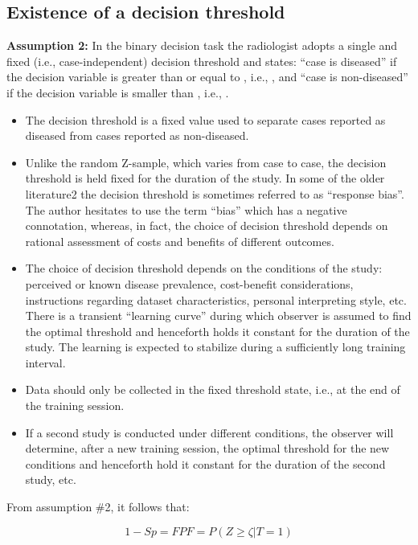 \documentclass[
]{book}
\providecommand{\tightlist}{%
  \setlength{\itemsep}{0pt}\setlength{\parskip}{0pt}}
\begin{document}
\hypertarget{existence-of-a-decision-threshold}{%
\subsection{Existence of a decision threshold}\label{existence-of-a-decision-threshold}}

\textbf{Assumption 2:} In the binary decision task the radiologist adopts a single and fixed (i.e., case-independent) decision threshold and states: ``case is diseased'' if the decision variable is greater than or equal to , i.e., , and ``case is non-diseased'' if the decision variable is smaller than , i.e., .

\begin{itemize}
\tightlist
\item
  The decision threshold is a fixed value used to separate cases reported as diseased from cases reported as non-diseased.
\item
  Unlike the random Z-sample, which varies from case to case, the decision threshold is held fixed for the duration of the study. In some of the older literature2 the decision threshold is sometimes referred to as ``response bias''. The author hesitates to use the term ``bias'' which has a negative connotation, whereas, in fact, the choice of decision threshold depends on rational assessment of costs and benefits of different outcomes.
\item
  The choice of decision threshold depends on the conditions of the study: perceived or known disease prevalence, cost-benefit considerations, instructions regarding dataset characteristics, personal interpreting style, etc. There is a transient ``learning curve'' during which observer is assumed to find the optimal threshold and henceforth holds it constant for the duration of the study. The learning is expected to stabilize during a sufficiently long training interval.
\item
  Data should only be collected in the fixed threshold state, i.e., at the end of the training session.
\item
  If a second study is conducted under different conditions, the observer will determine, after a new training session, the optimal threshold for the new conditions and henceforth hold it constant for the duration of the second study, etc.
\end{itemize}

From assumption \#2, it follows that:

\begin{equation} 
1-Sp=FPF=P(Z\ge \zeta|T=1)
\label{eq:binaryTaskFPF}
\end{equation}
\end{document}
